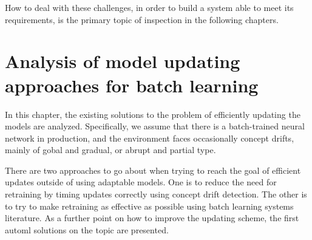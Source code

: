 How to deal with these challenges, in order to build a system able to meet its requirements, is the primary topic of inspection in the following chapters.







\chapter{Analysis of model updating approaches for batch learning}


In this chapter, the existing solutions to the problem of efficiently updating the models are analyzed. Specifically, we assume that there is a batch-trained neural network in production, and the environment faces occasionally concept drifts, mainly of gobal and gradual, or abrupt and partial type.

There are two approaches to go about when trying to reach the goal of efficient updates outside of using adaptable models. One is to reduce the need for retraining by timing updates correctly using concept drift detection. The other is to try to make retraining as effective as possible using batch learning systems literature. As a further point on how to improve the updating scheme, the first automl solutions on the topic are presented.

